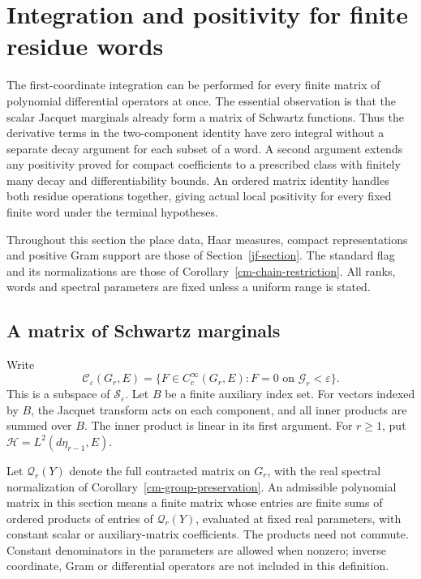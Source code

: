 \section{Integration and positivity for finite residue words}
\label{ji-section}

The first-coordinate integration can be performed for every finite
matrix of polynomial differential operators at once.  The essential
observation is that the scalar Jacquet marginals already form a
matrix of Schwartz functions.  Thus the derivative terms in the
two-component identity have zero integral without a separate decay
argument for each subset of a word.  A second argument extends any
positivity proved for compact coefficients to a prescribed class with
finitely many decay and differentiability bounds.  An ordered matrix
identity handles both residue operations together, giving actual local
positivity for every fixed finite word under the terminal hypotheses.

Throughout this section the place data, Haar measures, compact
representations and positive Gram support are those of
Section~\ref{jf-section}.  The standard flag and its normalizations
are those of Corollary~\ref{cm-chain-restriction}.  All ranks, words
and spectral parameters are fixed unless a uniform range is stated.

\subsection{A matrix of Schwartz marginals}

Write
\[
 \mathscr C_\varepsilon(G_r,E)
   =\{F\in C_c^\infty(G_r,E):F=0\text{ on }
                                      \mathcal G_r<\varepsilon\}.
\]
This is a subspace of \(\mathscr S_\varepsilon\).
Let \(B\) be a finite auxiliary index set.  For vectors indexed by
\(B\), the Jacquet transform acts on each component, and all inner
products are summed over \(B\).  The inner product is linear in its
first argument.  For \(r\geq1\), put
\(\mathcal H=L^2(d\eta_{r-1},E)\).

Let \(\mathcal Q_r(Y)\) denote the full contracted matrix on
\(G_r\), with the real spectral normalization of
Corollary~\ref{cm-group-preservation}.  An admissible polynomial
matrix in this section means a finite matrix whose entries are
finite sums of ordered products of entries of
\(\mathcal Q_r(Y)\), evaluated at fixed real parameters, with
constant scalar or auxiliary-matrix coefficients.  The products
need not commute.  Constant denominators in the parameters are
allowed when nonzero; inverse coordinate, Gram or differential
operators are not included in this definition.

